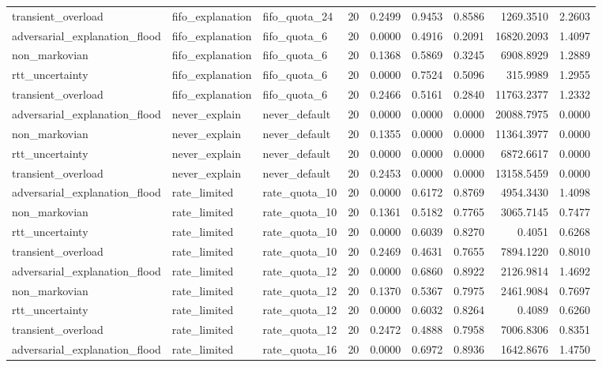 \begin{table}[t]
\begin{tabular}{lllrrrrrr}
transient\_overload & fifo\_explanation & fifo\_quota\_24 & 20 & 0.2499 & 0.9453 & 0.8586 & 1269.3510 & 2.2603 \\
adversarial\_explanation\_flood & fifo\_explanation & fifo\_quota\_6 & 20 & 0.0000 & 0.4916 & 0.2091 & 16820.2093 & 1.4097 \\
non\_markovian & fifo\_explanation & fifo\_quota\_6 & 20 & 0.1368 & 0.5869 & 0.3245 & 6908.8929 & 1.2889 \\
rtt\_uncertainty & fifo\_explanation & fifo\_quota\_6 & 20 & 0.0000 & 0.7524 & 0.5096 & 315.9989 & 1.2955 \\
transient\_overload & fifo\_explanation & fifo\_quota\_6 & 20 & 0.2466 & 0.5161 & 0.2840 & 11763.2377 & 1.2332 \\
adversarial\_explanation\_flood & never\_explain & never\_default & 20 & 0.0000 & 0.0000 & 0.0000 & 20088.7975 & 0.0000 \\
non\_markovian & never\_explain & never\_default & 20 & 0.1355 & 0.0000 & 0.0000 & 11364.3977 & 0.0000 \\
rtt\_uncertainty & never\_explain & never\_default & 20 & 0.0000 & 0.0000 & 0.0000 & 6872.6617 & 0.0000 \\
transient\_overload & never\_explain & never\_default & 20 & 0.2453 & 0.0000 & 0.0000 & 13158.5459 & 0.0000 \\
adversarial\_explanation\_flood & rate\_limited & rate\_quota\_10 & 20 & 0.0000 & 0.6172 & 0.8769 & 4954.3430 & 1.4098 \\
non\_markovian & rate\_limited & rate\_quota\_10 & 20 & 0.1361 & 0.5182 & 0.7765 & 3065.7145 & 0.7477 \\
rtt\_uncertainty & rate\_limited & rate\_quota\_10 & 20 & 0.0000 & 0.6039 & 0.8270 & 0.4051 & 0.6268 \\
transient\_overload & rate\_limited & rate\_quota\_10 & 20 & 0.2469 & 0.4631 & 0.7655 & 7894.1220 & 0.8010 \\
adversarial\_explanation\_flood & rate\_limited & rate\_quota\_12 & 20 & 0.0000 & 0.6860 & 0.8922 & 2126.9814 & 1.4692 \\
non\_markovian & rate\_limited & rate\_quota\_12 & 20 & 0.1370 & 0.5367 & 0.7975 & 2461.9084 & 0.7697 \\
rtt\_uncertainty & rate\_limited & rate\_quota\_12 & 20 & 0.0000 & 0.6032 & 0.8264 & 0.4089 & 0.6260 \\
transient\_overload & rate\_limited & rate\_quota\_12 & 20 & 0.2472 & 0.4888 & 0.7958 & 7006.8306 & 0.8351 \\
adversarial\_explanation\_flood & rate\_limited & rate\_quota\_16 & 20 & 0.0000 & 0.6972 & 0.8936 & 1642.8676 & 1.4750 \\

\end{tabular}
\end{table}
